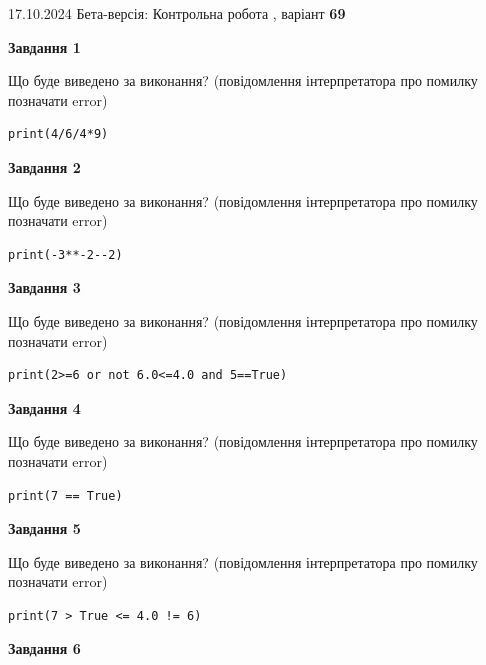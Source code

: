 \documentclass[12pt, ukrainian]{article}
\begin{document}
{\Large{17.10.2024 Бета-версія: Контрольна робота , варіант  \No \textbf { 69 }\par}}
{
\begin {large}
{\begin {center}\textbf{Завдання 1}\end {center}}

Що буде виведено за виконання? (повідомлення інтерпретатора про помилку позначати error)\par
\begin{verbatim}
print(4/6/4*9)
\end{verbatim}

{\begin {center}\textbf{Завдання 2}\end {center}}

Що буде виведено за виконання? (повідомлення інтерпретатора про помилку позначати error)\par
\begin{verbatim}
print(-3**-2--2)
\end{verbatim}

{\begin {center}\textbf{Завдання 3}\end {center}}

Що буде виведено за виконання? (повідомлення інтерпретатора про помилку позначати error)\par
\begin{verbatim}
print(2>=6 or not 6.0<=4.0 and 5==True)
\end{verbatim}

{\begin {center}\textbf{Завдання 4}\end {center}}

Що буде виведено за виконання? (повідомлення інтерпретатора про помилку позначати error)\par
\begin{verbatim}
print(7 == True)
\end{verbatim}

{\begin {center}\textbf{Завдання 5}\end {center}}

Що буде виведено за виконання? (повідомлення інтерпретатора про помилку позначати error)\par
\begin{verbatim}
print(7 > True <= 4.0 != 6)
\end{verbatim}

{\begin {center}\textbf{Завдання 6}\end {center}}


\end{large}}
\end{document}
